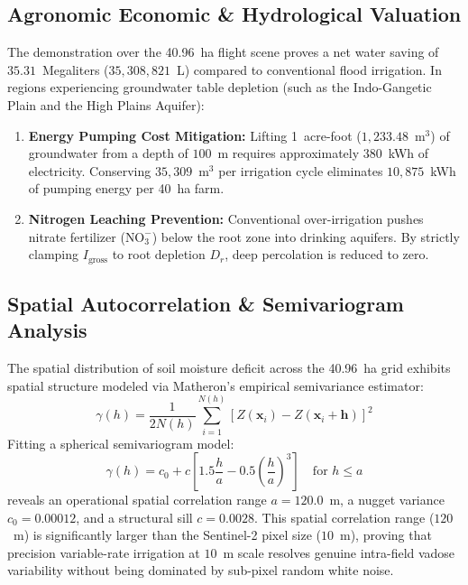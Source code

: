 \documentclass[11pt,a4paper]{article}
\theoremstyle{definition}
\theoremstyle{remark}
\begin{document}
\subsection{Agronomic Economic \& Hydrological Valuation}
The demonstration over the 40.96~ha flight scene proves a net water saving of $35.31$~Megaliters ($35,308,821$~L) compared to conventional flood irrigation. In regions experiencing groundwater table depletion (such as the Indo-Gangetic Plain and the High Plains Aquifer):
\begin{enumerate}
    \item \textbf{Energy Pumping Cost Mitigation:} Lifting 1~acre-foot ($1,233.48$~m$^3$) of groundwater from a depth of $100$~m requires approximately $380$~kWh of electricity. Conserving $35,309$~m$^3$ per irrigation cycle eliminates $10,875$~kWh of pumping energy per 40~ha farm.
    \item \textbf{Nitrogen Leaching Prevention:} Conventional over-irrigation pushes nitrate fertilizer ($\text{NO}_3^-$) below the root zone into drinking aquifers. By strictly clamping $I_{\text{gross}}$ to root depletion $D_r$, deep percolation is reduced to zero.
\end{enumerate}

\subsection{Spatial Autocorrelation \& Semivariogram Analysis}
The spatial distribution of soil moisture deficit across the 40.96~ha grid exhibits spatial structure modeled via Matheron's empirical semivariance estimator:
\begin{equation}
    \gamma(h) = \frac{1}{2 N(h)} \sum_{i=1}^{N(h)} \left[ Z(\mathbf{x}_i) - Z(\mathbf{x}_i + \mathbf{h}) \right]^2
\end{equation}
Fitting a spherical semivariogram model:
\begin{equation}
    \gamma(h) = c_0 + c \left[ 1.5 \frac{h}{a} - 0.5 \left(\frac{h}{a}\right)^3 \right] \quad \text{for } h \le a
\end{equation}
reveals an operational spatial correlation range $a = 120.0$~m, a nugget variance $c_0 = 0.00012$, and a structural sill $c = 0.0028$. This spatial correlation range ($120$~m) is significantly larger than the Sentinel-2 pixel size ($10$~m), proving that precision variable-rate irrigation at $10$~m scale resolves genuine intra-field vadose variability without being dominated by sub-pixel random white noise.
\end{document}
